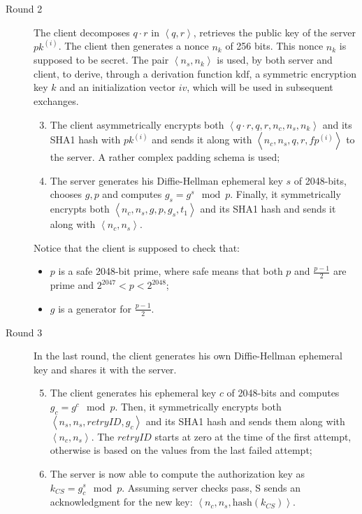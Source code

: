 \begin{description}
    \item[Round 2] The client decomposes $q\cdot r$ in $\left<q, r\right>$, retrieves the public key of the server $pk^{\left(i\right)}$. The client then generates a nonce $n_k$ of 256 bits. This nonce $n_k$ is supposed to be secret. The pair $\left<n_s, n_k\right>$ is used, by both server and client, to derive, through a derivation function $\mbox{kdf}$, a symmetric encryption key $k$ and an initialization vector $iv$, which will be used in subsequent exchanges.
    \begin{enumerate}
        \setcounter{enumi}{2}
        \item{The client asymmetrically encrypts both $\left<q\cdot r, q, r, n_c, n_s, n_k\right>$ and its SHA1 hash with $pk^{(i)}$ and sends it along with $\left<n_c, n_s, q, r, fp^{(i)}\right>$ to the server. A rather complex padding schema is used;}
        \item{The server generates his Diffie-Hellman ephemeral key $s$ of 2048-bits, chooses $g, p$ and computes $g_s = g^s \mod{p}$. Finally, it symmetrically encrypts both $\left<n_c, n_s, g, p, g_s, t_1\right>$ and its SHA1 hash and sends it along with $\left<n_c, n_s\right>$.}
    \end{enumerate}

    Notice that the client is supposed to check that:
    \begin{itemize}
        \item{$p$ is a safe 2048-bit prime, where safe means that both $p$ and $\frac{p-1}{2}$ are prime and $2^{2047} < p < 2^{2048}$;}
        \item{$g$ is a generator for $\frac{p-1}{2}$.}
    \end{itemize}

    \item[Round 3] In the last round, the client generates his own Diffie-Hellman ephemeral key and shares it with the server.
    \begin{enumerate}
        \setcounter{enumi}{4}
        \item{The client generates his ephemeral key $c$ of 2048-bits and computes $g_c = g^c \mod{p}$. Then, it symmetrically encrypts both $\left<n_s, n_s, retryID, g_c\right>$ and its SHA1 hash and sends them along with $\left<n_c, n_s\right>$. The $retryID$ starts at zero at the time of the first attempt, otherwise is based on the values from the last failed attempt;}
        \item{The server is now able to compute the authorization key as $k_{CS} = g_c ^ s \mod{p}$. Assuming server checks pass, S sends an acknowledgment for the new key: $\left<n_c, n_s, \mbox{hash}\left(k_{CS}\right)\right>$.}
    \end{enumerate}

\end{description}

